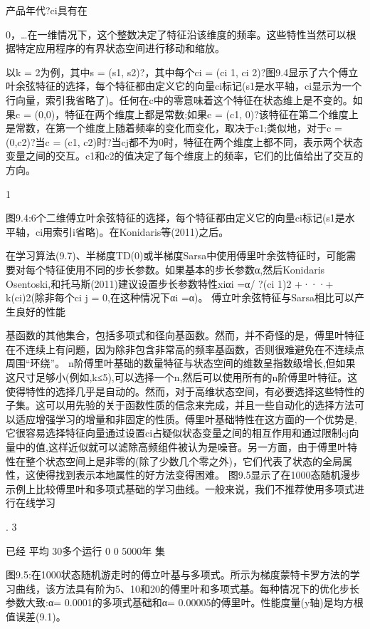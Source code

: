 产品年代?ci具有在{0，…在一维情况下，这个整数决定了特征沿该维度的频率。这些特性当然可以根据特定应用程序的有界状态空间进行移动和缩放。

以k = 2为例，其中s = (s1, s2)?，其中每个ci = (ci 1, ci 2)?图9.4显示了六个傅立叶余弦特征的选择，每个特征都由定义它的向量ci标记(s1是水平轴，ci显示为一个行向量，索引我省略了)。任何在c中的零意味着这个特征在状态维上是不变的。如果c = (0,0)，特征在两个维度上都是常数;如果c = (c1, 0)?该特征在第二个维度上是常数，在第一个维度上随着频率的变化而变化，取决于c1;类似地，对于c = (0,c2)?当c = (c1, c2)时?当cj都不为0时，特征在两个维度上都不同，表示两个状态变量之间的交互。c1和c2的值决定了每个维度上的频率，它们的比值给出了交互的方向。
 
 
1



图9.4:6个二维傅立叶余弦特征的选择，每个特征都由定义它的向量ci标记(s1是水平轴，ci用索引i省略)。在Konidaris等(2011)之后。

在学习算法(9.7)、半梯度TD(0)或半梯度Sarsa中使用傅里叶余弦特征时，可能需要对每个特征使用不同的步长参数。如果基本的步长参数α,然后Konidaris Osentoski,和托马斯(2011)建议设置步长参数特性xiαi =α/ ?(ci 1)2 +···+ k(ci)2(除非每个ci j = 0,在这种情况下αi =α)。
傅立叶余弦特征与Sarsa相比可以产生良好的性能

基函数的其他集合，包括多项式和径向基函数。然而，并不奇怪的是，傅里叶特征在不连续上有问题，因为除非包含非常高的频率基函数，否则很难避免在不连续点周围“环绕”。
n阶傅里叶基础的数量特征与状态空间的维数呈指数级增长,但如果这尺寸足够小(例如,k≤5),可以选择一个n,然后可以使用所有的n阶傅里叶特征。这使得特性的选择几乎是自动的。然而，对于高维状态空间，有必要选择这些特性的子集。这可以用先验的关于函数性质的信念来完成，并且一些自动化的选择方法可以适应增强学习的增量和非固定的性质。傅里叶基础特性在这方面的一个优势是,它很容易选择特征向量通过设置ci占疑似状态变量之间的相互作用和通过限制cj向量中的值,这样近似就可以滤除高频组件被认为是噪音。另一方面，由于傅里叶特性在整个状态空间上是非零的(除了少数几个零之外)，它们代表了状态的全局属性，这使得找到表示本地属性的好方法变得困难。
图9.5显示了在1000态随机漫步示例上比较傅里叶和多项式基础的学习曲线。一般来说，我们不推荐使用多项式进行在线学习
 
. 3

已经
平均
30多个运行
0
0 					5000年
集

图9.5:在1000状态随机游走时的傅立叶基与多项式。所示为梯度蒙特卡罗方法的学习曲线，该方法具有阶为5、10和20的傅里叶和多项式基。每种情况下的优化步长参数大致:α= 0.0001的多项式基础和α= 0.00005的傅里叶。性能度量(y轴)是均方根值误差(9.1)。


}
